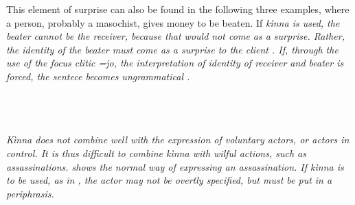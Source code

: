 % 

This element of surprise can also be found in the following three examples, where a person, probably a masochist, gives money to be beaten. If \em kìnna \em is used, the beater cannot be the receiver, because that would not come as a surprise. Rather, the identity of the beater must come as a surprise to the client . If, through the use of the focus clitic \em =jo\em, the interpretation of identity of receiver and beater is forced, the sentece becomes ungrammatical .


 \\
 \\
 \\


\em Kìnna \em does not combine well with the expression of voluntary actors, or actors in control. It is thus difficult to combine \em kìnna \em with wilful actions, such as assassinations.  shows the normal way of expressing an assassination. If \em kìnna \em is to be used, as in , the actor may not be overtly specified, but must be put in a periphrasis.

